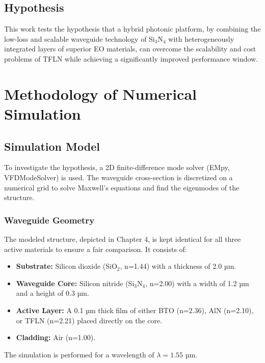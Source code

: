 \documentclass[12pt, a4paper, numbers]{report}
\begin{document}
\section{Hypothesis}
This work tests the hypothesis that a hybrid photonic platform, by combining the low-loss and scalable waveguide technology of Si$_3$N$_4$ with heterogeneously integrated layers of superior EO materials, can overcome the scalability and cost problems of TFLN while achieving a significantly improved performance window.

\chapter{Methodology of Numerical Simulation}
\section{Simulation Model}
To investigate the hypothesis, a 2D finite-difference mode solver (EMpy, VFDModeSolver) is used. The waveguide cross-section is discretized on a numerical grid to solve Maxwell's equations and find the eigenmodes of the structure.

\subsection{Waveguide Geometry}
The modeled structure, depicted in Chapter 4, is kept identical for all three active materials to ensure a fair comparison. It consists of:
\begin{itemize}
    \item \textbf{Substrate:} Silicon dioxide (SiO$_2$, n=1.44) with a thickness of 2.0 µm.
    \item \textbf{Waveguide Core:} Silicon nitride (Si$_3$N$_4$, n=2.00) with a width of 1.2 µm and a height of 0.3 µm.
    \item \textbf{Active Layer:} A 0.1 µm thick film of either BTO (n=2.36), AlN (n=2.10), or TFLN (n=2.21) placed directly on the core.
    \item \textbf{Cladding:} Air (n=1.00).
\end{itemize}
The simulation is performed for a wavelength of $\lambda = 1.55$ µm.
\end{document}
